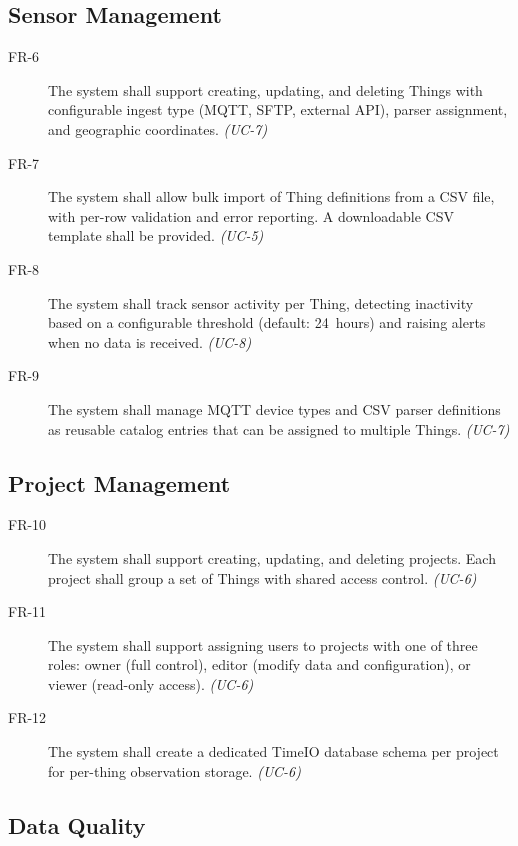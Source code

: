 \subsection{Sensor Management}
\label{sec:req-functional-sms}

\begin{description}
  \item[FR-6] The system shall support creating, updating, and deleting Things with configurable
    ingest type (MQTT, SFTP, external API), parser assignment, and geographic coordinates.
    \emph{(UC-7)}
  \item[FR-7] The system shall allow bulk import of Thing definitions from a CSV file, with
    per-row validation and error reporting. A downloadable CSV template shall be provided.
    \emph{(UC-5)}
  \item[FR-8] The system shall track sensor activity per Thing, detecting inactivity based on
    a configurable threshold (default: 24~hours) and raising alerts when no data is received.
    \emph{(UC-8)}
  \item[FR-9] The system shall manage MQTT device types and CSV parser definitions as reusable
    catalog entries that can be assigned to multiple Things. \emph{(UC-7)}
\end{description}

\subsection{Project Management}
\label{sec:req-functional-projects}

\begin{description}
  \item[FR-10] The system shall support creating, updating, and deleting projects. Each project
    shall group a set of Things with shared access control. \emph{(UC-6)}
  \item[FR-11] The system shall support assigning users to projects with one of three roles:
    owner (full control), editor (modify data and configuration), or viewer (read-only access).
    \emph{(UC-6)}
  \item[FR-12] The system shall create a dedicated TimeIO database schema per project for
    per-thing observation storage. \emph{(UC-6)}
\end{description}

\subsection{Data Quality}
\label{sec:req-functional-quality}

